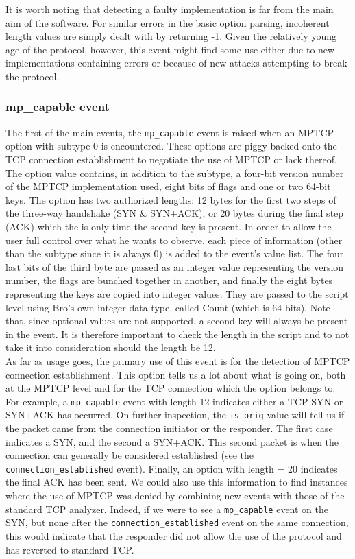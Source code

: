 It is worth noting that detecting a faulty implementation is far from the main aim of the software. For similar errors in the basic option parsing, incoherent length values are simply dealt with by returning -1. Given the relatively young age of the protocol, however, this event might find some use either due to new implementations containing errors or because of new attacks attempting to break the protocol.

\subsubsection{mp\_capable event}
The first of the main events, the \texttt{mp\_capable} event is raised when an MPTCP option with subtype 0 is encountered. These options are piggy-backed onto the TCP connection establishment to negotiate the use of MPTCP or lack thereof. The option value contains, in addition to the subtype, a four-bit version number of the MPTCP implementation used, eight bits of flags and one or two 64-bit keys. The option has two authorized lengths: 12 bytes for the first two steps of the three-way handshake (SYN \& SYN+ACK), or 20 bytes during the final step (ACK) which the is only time the second key is present. In order to allow the user full control over what he wants to observe, each piece of information (other than the subtype since it is always 0) is added to the event's value list. The four last bits of the third byte are passed as an integer value representing the version number, the flags are bunched together in another, and finally the eight bytes representing the keys are copied into integer values.  They are passed to the script level using Bro's own integer data type, called Count (which is 64 bits). Note that, since optional values are not supported, a second key will always be present in the event. It is therefore important to check the length in the script and to not take it into consideration should the length be 12.\\

As far as usage goes, the primary use of this event is for the detection of MPTCP connection establishment. This option tells us a lot about what is going on, both at the MPTCP level and for the TCP connection which the option belongs to. For example, a \texttt{mp\_capable} event with length 12 indicates either a TCP SYN or SYN+ACK has occurred. On further inspection, the \texttt{is\_orig} value will tell us if the packet came from the connection initiator or the responder. The first case indicates a SYN, and the second a SYN+ACK. This second packet is when the connection can generally be considered established (see the \texttt{connection\_established} event). Finally, an option with length = 20 indicates the final ACK has been sent. We could also use this information to find instances where the use of MPTCP was denied by combining new events with those of the standard TCP analyzer. Indeed, if we were to see a \texttt{mp\_capable} event on the SYN, but none after the \texttt{connection\_established} event on the same connection, this would indicate that the responder did not allow the use of the protocol and has reverted to standard TCP. \\

